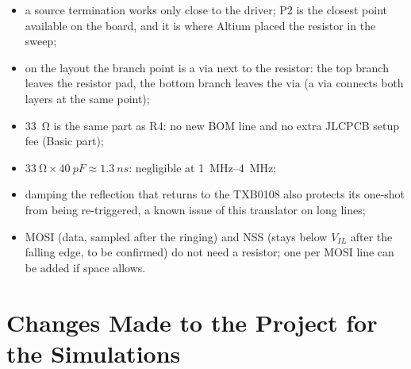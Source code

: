 \documentclass[11pt,a4paper]{article}
\begin{document}
\begin{itemize}[nosep]
    \item a source termination works only close to the driver; P2 is the closest point available on the
    board, and it is where Altium placed the resistor in the sweep;
    \item on the layout the branch point is a via next to the resistor: the top branch leaves the
    resistor pad, the bottom branch leaves the via (a via connects both layers at the same
    point);
    \item \qty{33}{\ohm} is the same part as R4: no new BOM line and no extra JLCPCB setup fee (Basic
    part);
    \item $\qty{33}{\ohm} \times \qty{40}{pF} \approx \qty{1.3}{ns}$: negligible at \qtyrange{1}{4}{MHz};
    \item damping the reflection that returns to the TXB0108 also protects its one-shot from being
    re-triggered, a known issue of this translator on long lines;
    \item MOSI (data, sampled after the ringing) and NSS (stays below $V_{IL}$ after the falling edge,
    to be confirmed) do not need a resistor; one per MOSI line can be added if space allows.
\end{itemize}

\section{Changes Made to the Project for the Simulations}\label{sec:changes}
\end{document}
